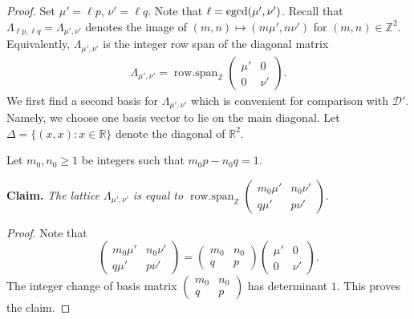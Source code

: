 \documentclass[11pt, letterpaper, reqno]{amsart}
\theoremstyle{definition}
\theoremstyle{remark}
\numberwithin{equation}{section}
\newcommand{\RR}{\ensuremath{\mathbb{R}}}
\newcommand{\ZZ}{\ensuremath{\mathbb{Z}}}
\newcommand{\uu}{{\mu'}}
\newcommand{\vv}{{\nu'}}
\newcommand{\cDprime}{{\mathcal{D}'}}
\newcommand{\egcd}{{\rm egcd}}
\DeclareMathOperator{\rowspan}{row.span}
\begin{document}
\begin{proof}
Set $\uu = \ell p$, $\vv = \ell q$. 
Note that $\ell = \egcd(\uu,\vv) $.
Recall that $\Lambda_{\ell p, \ell q} = \Lambda_{\uu,\vv}$ denotes 
the image of 
$(m,n) \mapsto (m\uu, n\vv) $
for $(m,n) \in \ZZ^2$.
Equivalently, $\Lambda_{\uu,\vv}$ is the integer row span 
of the diagonal matrix
\begin{align*}
\Lambda_{\uu,\vv} = \rowspan_\ZZ\begin{pmatrix}
\uu & 0 \\
0 & \vv
\end{pmatrix}.
\end{align*}
We first find a second basis for $\Lambda_{\uu,\vv}$ which is convenient
for comparison with $\cDprime$.
Namely, we choose one basis vector to lie on the main diagonal.
Let $\Delta = \{(x,x) : x\in \RR\}$ denote the  diagonal of $\RR^2$.

Let $m_0, n_0 \geq 1$ be integers such that $m_0 p - n_0 q = 1$.\medskip

{\bf Claim.}
{\em  The lattice $\Lambda_{\uu,\vv}$ is equal to
$\rowspan_\ZZ\begin{pmatrix}
m_0 \uu & n_0 \vv \\
q \uu & p \vv
\end{pmatrix} .$
}

{\em Proof}. Note that
\[ 
\begin{pmatrix}
m_0 \uu & n_0 \vv \\
q \uu & p \vv
\end{pmatrix} = 
\begin{pmatrix}
m_0  & n_0  \\
q  & p 
\end{pmatrix}\begin{pmatrix}
 \uu & 0  \\
 0 &  \vv
\end{pmatrix}.
\]
The integer change of basis matrix
$ \begin{pmatrix}
m_0  & n_0  \\
q  & p 
\end{pmatrix}$
has determinant $1$.
This proves the claim.


\end{proof}
\end{document}
